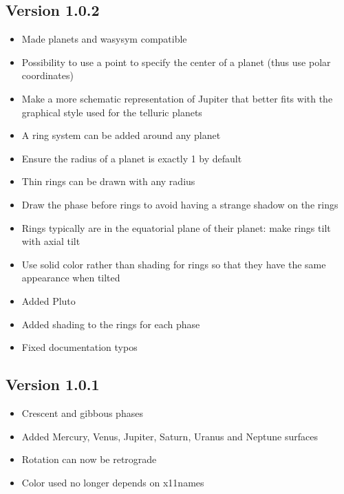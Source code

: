 \documentclass[12pt, twocolumn]{article}
\begin{document}
\subsection{Version 1.0.2}
\begin{itemize}
\item Made planets and wasysym compatible
\item Possibility to use a point to specify the center of a planet (thus use polar coordinates)
\item Make a more schematic representation of Jupiter that better fits with the graphical style used for the telluric planets
\item A ring system can be added around any planet
\item Ensure the radius of a planet is exactly 1 by default
\item Thin rings can be drawn with any radius
\item Draw the phase before rings to avoid having a strange shadow on the rings
\item Rings typically are in the equatorial plane of their planet: make rings tilt with axial tilt
\item Use solid color rather than shading for rings so that they have the same appearance when tilted
\item Added Pluto
\item Added shading to the rings for each phase
\item Fixed documentation typos
\end{itemize}

\subsection{Version 1.0.1}
\begin{itemize}
\item Crescent and gibbous phases
\item Added Mercury, Venus, Jupiter, Saturn, Uranus and Neptune surfaces
\item Rotation can now be retrograde
\item Color used no longer depends on x11names
\end{itemize}
\end{document}
